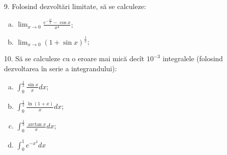 \documentclass[11pt,a4paper]{article}
\newcommand\ds{\displaystyle}
\theoremstyle{dotless}
\theoremstyle{dotlessdr}
\begin{document}
\vspace{1cm}

9. Folosind dezvoltări limitate, să se calculeze:
\begin{enumerate}[(a)]
\item $\lim_{x \to 0} \frac{e^{-\frac{x^2}{2}} - \cos x}{x^4}$;
\item $\lim_{x \to 0} (1 + \sin x)^{\frac{1}{x}}$;
\end{enumerate}

\vspace{1cm}

10. Să se calculeze cu o eroare mai mică decît $10^{-3}$ integralele (folosind
dezvoltarea în serie a integrandului):
\begin{enumerate}[(a)]
\item $\ds\int_0^{\frac{1}{2}} \frac{\sin x}{x} dx$;
\item $\ds\int_0^{\frac{1}{2}} \frac{\ln(1 + x)}{x} dx$;
\item $\ds\int_0^{\frac{1}{3}} \frac{\arctan x}{x} dx$;
\item $\ds\int_0^1 e^{-x^2} dx$
\end{enumerate}
\end{document}
